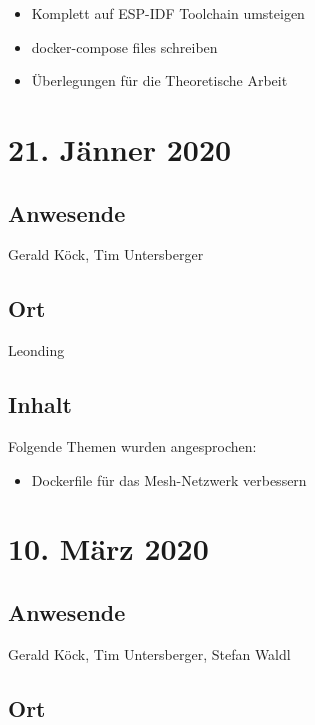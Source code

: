 \begin{itemize}
  \item Komplett auf ESP-IDF Toolchain umsteigen
  \item docker-compose files schreiben
  \item Überlegungen für die Theoretische Arbeit
\end{itemize}

\pagebreak

\section*{21. Jänner 2020}

\subsection*{Anwesende}

Gerald Köck, Tim Untersberger

\subsection*{Ort}

Leonding

\subsection*{Inhalt}

Folgende Themen wurden angesprochen:

\begin{itemize}
  \item Dockerfile für das Mesh-Netzwerk verbessern
\end{itemize}

\pagebreak

\section*{10. März 2020}

\subsection*{Anwesende}

Gerald Köck, Tim Untersberger, Stefan Waldl

\subsection*{Ort}

